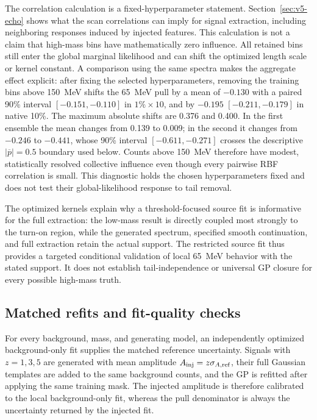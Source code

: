 The correlation calculation is a fixed-hyperparameter statement.
Section~\ref{sec:v5-echo} shows what the scan correlations can imply for
signal extraction, including neighboring responses induced by injected
features. This calculation is not a claim that
high-mass bins have mathematically zero influence.  All retained bins still enter the
global marginal likelihood and can shift the optimized length scale or kernel
constant.  A comparison using the same spectra makes the aggregate effect explicit: after fixing
the selected hyperparameters, removing the training bins above 150~MeV shifts the
65~MeV pull by a mean of $-0.130$ with a paired 90\% interval
$[-0.151,-0.110]$ in $1\%\times10$, and by $-0.195$
$[-0.211,-0.179]$ in native 10\%.  The maximum absolute shifts are 0.376 and
0.400. In the first ensemble the mean changes from 0.139 to 0.009; in the second it
changes from $-0.246$ to $-0.441$, whose 90\% interval
$[-0.611,-0.271]$ crosses the descriptive $|\overline p|=0.5$ boundary used below.
Counts above 150~MeV
therefore have modest, statistically resolved collective influence even though every
pairwise RBF correlation is small.  This diagnostic holds the chosen hyperparameters
fixed and does not test their global-likelihood response to tail removal.

The optimized kernels explain why a threshold-focused source fit is informative for
the full extraction: the low-mass result is
directly coupled most strongly to the turn-on region, while the generated spectrum,
specified smooth continuation, and full extraction retain the actual support.  The
restricted source fit thus provides a targeted conditional validation of local
65~MeV behavior with the stated support. It does not establish
tail-independence or universal GP closure for every possible high-mass truth.

\subsection{Matched refits and fit-quality checks}

For every background, mass, and generating model, an independently optimized background-only
fit supplies the matched reference uncertainty.  Signals with
$z=1,3,5$ are generated with mean amplitude
$A_{\rm inj}=z\sigma_{A,{\rm ref}}$, their full Gaussian templates are added to the
same background counts, and the GP is refitted after applying the same training mask.
The injected amplitude is therefore calibrated to the local background-only fit,
whereas the pull denominator is always the uncertainty returned by the injected fit.

